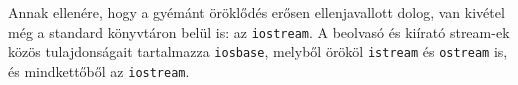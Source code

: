 \documentclass[a4paper,11.5pt,table]{article}
\begin{document}
	Annak ellenére, hogy a gyémánt öröklődés erősen ellenjavallott dolog, van kivétel még a standard könyvtáron belül is: az \texttt{iostream}. A beolvasó és kiírató stream-ek közös tulajdonságait tartalmazza \texttt{iosbase}, melyből örököl \texttt{istream} és \texttt{ostream} is, és mindkettőből az \texttt{iostream}.
%
%
%
%
%	
%	
%	
%	
%	
%	
%	
\end{document}
